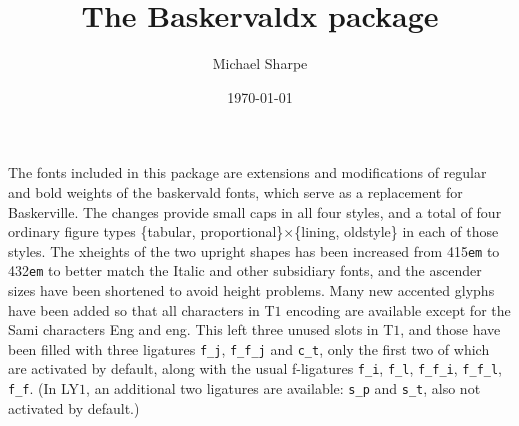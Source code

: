 \documentclass[11pt]{article}
\title{The Baskervaldx package}
\author{Michael Sharpe}
\date{\today}  %
\begin{document}
\maketitle
The fonts included in this package are extensions and modifications of  regular and bold weights of the \textsf{baskervald} fonts, which serve as a  replacement for \textsf{Baskerville}. The changes provide small caps in all four styles, and a total of four ordinary figure types \{tabular, proportional\}$\times$\{lining, oldstyle\} in each of those styles. The xheights of the two upright shapes has been increased from 415{\tt em} to 432{\tt em} to better match the Italic and other subsidiary fonts, and the ascender sizes have been shortened to avoid height problems. Many new accented glyphs have been added so that 
all characters in T$1$ encoding are available  except for the Sami characters Eng and eng. This left three unused slots in T$1$, and those have been filled with three ligatures \verb|f_j|, \verb|f_f_j| and \verb|c_t|, only the first two of which are activated by default, along with the usual f-ligatures \verb|f_i|, \verb|f_l|, \verb|f_f_i|, \verb|f_f_l|, \verb|f_f|. (In LY$1$, an additional two ligatures are available: \verb|s_p| and \verb|s_t|, also not activated by default.)
\end{document}
